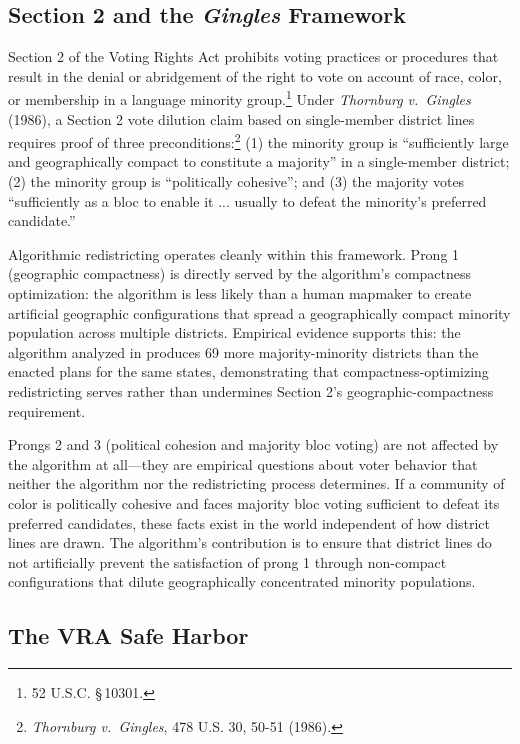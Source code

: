 \subsection{Section 2 and the \textit{Gingles} Framework}

Section 2 of the Voting Rights Act prohibits voting practices or procedures that result in the denial or abridgement of the right to vote on account of race, color, or membership in a language minority group.\footnote{52 U.S.C. \S\,10301.} Under \textit{Thornburg v.\ Gingles} (1986), a Section 2 vote dilution claim based on single-member district lines requires proof of three preconditions:\footnote{\textit{Thornburg v.\ Gingles}, 478 U.S. 30, 50-51 (1986).} (1) the minority group is ``sufficiently large and geographically compact to constitute a majority'' in a single-member district; (2) the minority group is ``politically cohesive''; and (3) the majority votes ``sufficiently as a bloc to enable it ... usually to defeat the minority's preferred candidate.''

Algorithmic redistricting operates cleanly within this framework. Prong 1 (geographic compactness) is directly served by the algorithm's compactness optimization: the algorithm is less likely than a human mapmaker to create artificial geographic configurations that spread a geographically compact minority population across multiple districts. Empirical evidence supports this: the algorithm analyzed in \citet{dellaLibera2026vra} produces 69 more majority-minority districts than the enacted plans for the same states, demonstrating that compactness-optimizing redistricting serves rather than undermines Section 2's geographic-compactness requirement.

Prongs 2 and 3 (political cohesion and majority bloc voting) are not affected by the algorithm at all---they are empirical questions about voter behavior that neither the algorithm nor the redistricting process determines. If a community of color is politically cohesive and faces majority bloc voting sufficient to defeat its preferred candidates, these facts exist in the world independent of how district lines are drawn. The algorithm's contribution is to ensure that district lines do not artificially prevent the satisfaction of prong 1 through non-compact configurations that dilute geographically concentrated minority populations.

\subsection{The VRA Safe Harbor}

